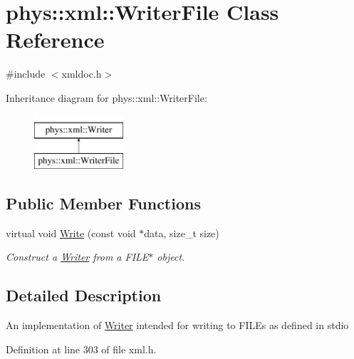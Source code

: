 \hypertarget{classphys_1_1xml_1_1WriterFile}{
\section{phys::xml::WriterFile Class Reference}
\label{dc/d53/classphys_1_1xml_1_1WriterFile}
}


{\ttfamily \#include $<$xmldoc.h$>$}

Inheritance diagram for phys::xml::WriterFile:\begin{figure}[H]
\begin{center}
\leavevmode
\includegraphics[height=2.000000cm]{dc/d53/classphys_1_1xml_1_1WriterFile}
\end{center}
\end{figure}
\subsection*{Public Member Functions}
\begin{DoxyCompactItemize}
\item 
virtual void \hyperlink{classphys_1_1xml_1_1WriterFile_a4c4348e30dc03b22f7d4ee15bd386ab2}{Write} (const void $\ast$data, size\_\-t size)
\begin{DoxyCompactList}\small\item\em Construct a \hyperlink{classphys_1_1xml_1_1Writer}{Writer} from a FILE$\ast$ object. \item\end{DoxyCompactList}\end{DoxyCompactItemize}


\subsection{Detailed Description}
An implementation of \hyperlink{classphys_1_1xml_1_1Writer}{Writer} intended for writing to FILEs as defined in stdio 

Definition at line 303 of file xml.h.



